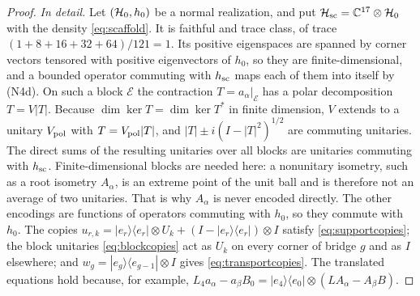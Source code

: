 \begin{proof}
\emph{In detail.} Let $(\mathcal H_0,h_0)$ be a normal realization, and put $\mathcal H_{\rm sc}=\mathbb C^{17}\otimes\mathcal H_0$ with the density \eqref{eq:scaffold}. It is faithful and trace class, of trace $(1+8+16+32+64)/121=1$. Its positive eigenspaces are spanned by corner vectors tensored with positive eigenvectors of $h_0$, so they are finite-dimensional, and a bounded operator commuting with $h_{\rm sc}$ maps each of them into itself by (N4d). On such a block $\mathcal E$ the contraction $T=a_\alpha|_{\mathcal E}$ has a polar decomposition $T=V|T|$. Because $\dim\ker T=\dim\ker T^*$ in finite dimension, $V$ extends to a unitary $V_{\rm pol}$ with $T=V_{\rm pol}|T|$, and $|T|\pm i(I-|T|^2)^{1/2}$ are commuting unitaries. The direct sums of the resulting unitaries over all blocks are unitaries commuting with $h_{\rm sc}$. Finite-dimensional blocks are needed here: a nonunitary isometry, such as a root isometry $A_\alpha$, is an extreme point of the unit ball and is therefore not an average of two unitaries. That is why $A_\alpha$ is never encoded directly. The other encodings are functions of operators commuting with $h_0$, so they commute with $h_0$. The copies $u_{r,k}=|e_r\rangle\langle e_r|\otimes U_k+(I-|e_r\rangle\langle e_r|)\otimes I$ satisfy \eqref{eq:supportcopies}; the block unitaries \eqref{eq:blockcopies} act as $U_k$ on every corner of bridge $g$ and as $I$ elsewhere; and $w_g=|e_g\rangle\langle e_{g-1}|\otimes I$ gives \eqref{eq:transportcopies}. The translated equations hold because, for example, $L_4a_\alpha-a_\beta B_0=|e_4\rangle\langle e_0|\otimes(LA_\alpha-A_\beta B)$.


\end{proof}
